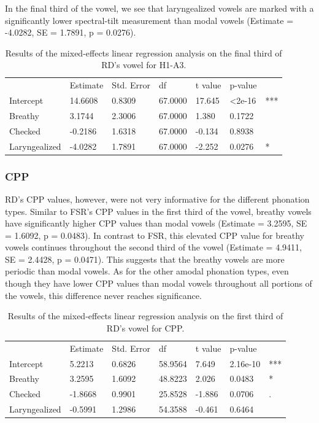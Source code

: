 \documentclass[12pt, letterpaper]{article}
\providecommand{\lsptoprule}{\midrule\toprule}
\providecommand{\lspbottomrule}{\bottomrule\midrule}
\begin{document}
In the final third of the vowel, we see that laryngealized vowels are marked with a significantly lower spectral-tilt measurement than modal vowels (Estimate = -4.0282, SE = 1.7891, p = 0.0276). 

\begin{table}[!h]
    \centering
    \caption{Results of the mixed-effects linear regression analysis on the final third of RD's vowel for H1-A3. }
    \label{tab:RD_H1A3_Third}
    \begin{tabular}{lllllll}
	\lsptoprule
					&  Estimate  & Std. Error & df & t value & p-value & \\
        Intercept       & 14.6608 & 0.8309 & 67.0000 & 17.645 & <2e-16 & *** \\
  	Breathy   		&  3.1744 & 2.3006 & 67.0000 &  1.380 &  0.1722 & \\
	Checked    		& -0.2186 & 1.6318 & 67.0000 & -0.134 &  0.8938 &  \\
	Laryngealized	& -4.0282 & 1.7891 & 67.0000 & -2.252 &  0.0276 & * \\
        \lspbottomrule
    \end{tabular}
\end{table}

\subsubsection{CPP}

RD's CPP values, however, were not very informative for the different phonation types. Similar to FSR's CPP values in the first third of the vowel, breathy vowels have significantly higher CPP values than modal vowels (Estimate = 3.2595, SE = 1.6092, p = 0.0483). In contrast to FSR, this elevated CPP value for breathy vowels continues throughout the second third of the vowel (Estimate = 4.9411, SE = 2.4428, p = 0.0471). This suggests that the breathy vowels are more periodic than modal vowels. As for the other amodal phonation types, even though they have lower CPP values than modal vowels throughout all portions of the vowels, this difference never reaches significance. 

\begin{table}[!h]
    \centering
    \caption{Results of the mixed-effects linear regression analysis on the first third of RD's  vowel for CPP. }
    \label{tab:RD_CPP_First}
    \begin{tabular}{lllllll}
	\lsptoprule
					&  Estimate  & Std. Error & df & t value & p-value & \\
        Intercept       &  5.2213 & 0.6826 & 58.9564 & 7.649 & 2.16e-10 & *** \\  
  	Breathy   		&  3.2595 & 1.6092 & 48.8223 & 2.026 & 0.0483 & *\\
	Checked    		& -1.8668 & 0.9901 & 25.8528 & -1.886 & 0.0706 & . \\
	Laryngealized	&  -0.5991 & 1.2986 & 54.3588 & -0.461 & 0.6464 &\\
        \lspbottomrule
    \end{tabular}
\end{table}
\end{document}
